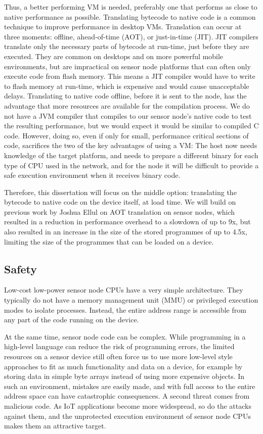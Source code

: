 Thus, a better performing VM is needed, preferably one that performs as close to native performance as possible. Translating bytecode to native code is a common technique to improve performance in desktop VMs. Translation can occur at three moments: offline, ahead-of-time (AOT), or just-in-time (JIT). JIT compilers translate only the necessary parts of bytecode at run-time, just before they are executed. They are common on desktops and on more powerful mobile environments, but are impractical on sensor node platforms that can often only execute code from flash memory. This means a JIT compiler would have to write to flash memory at run-time, which is expensive and would cause unacceptable delays. Translating to native code offline, before it is sent to the node, has the advantage that more resources are available for the compilation process. We do not have a JVM compiler that compiles to our sensor node's native code to test the resulting performance, but we would expect it would be similar to compiled C code. However, doing so, even if only for small, performance critical sections of code, sacrifices the two of the key advantages of using a VM: The host now needs knowledge of the target platform, and needs to prepare a different binary for each type of CPU used in the network, and for the node it will be difficult to provide a safe execution environment when it receives binary code.

Therefore, this dissertation will focus on the middle option: translating the bytecode to native code on the device itself, at load time. We will build on previous work by Joshua Ellul \cite{Ellul:2012thesis} on AOT translation on sensor nodes, which resulted in a reduction in performance overhead to a slowdown of up to 9x, but also resulted in an increase in the size of the stored programmes of up to 4.5x, limiting the size of the programmes that can be loaded on a device.

\subsection{Safety}
\label{sec-introduction-safety}
Low-cost low-power sensor node CPUs have a very simple architecture. They typically do not have a memory management unit (MMU) or privileged execution modes to isolate processes. Instead, the entire address range is accessible from any part of the code running on the device.

At the same time, sensor node code can be complex. While programming in a high-level language can reduce the risk of programming errors, the limited resources on a sensor device still often force us to use more low-level style approaches to fit as much functionality and data on a device, for example by storing data in simple byte arrays instead of using more expensive objects. In such an environment, mistakes are easily made, and with full access to the entire address space can have catastrophic consequences. A second threat comes from malicious code. As IoT applications become more widespread, so do the attacks against them, and the unprotected execution environment of sensor node CPUs makes them an attractive target.

